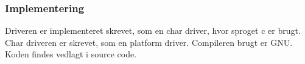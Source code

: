 \documentclass[Rapport/RPi/RPI.tex]{subfiles}
\begin{document}
\subsubsection{Implementering}\label{sec:I2C_interruptDriver_implementering}
Driveren er implementeret skrevet, som en char driver, hvor sproget c er brugt. Char driveren er skrevet, som en platform driver. Compileren brugt er GNU. Koden findes vedlagt i source code.
\end{document}
